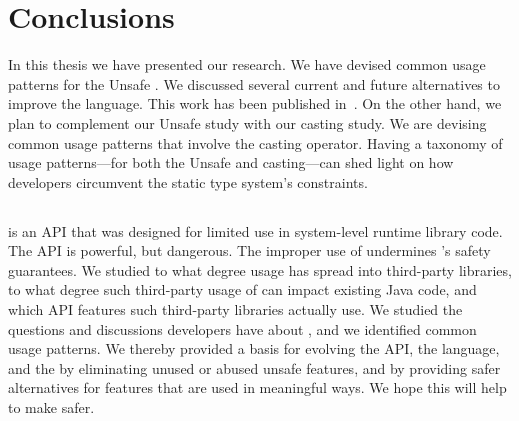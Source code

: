 \chapter{Conclusions}\label{cha:conclusions}

In this thesis we have presented our research.
We have devised common usage patterns for the \java{} Unsafe \api.
We discussed several current and future alternatives to improve the
\java{} language.
This work has been published in~\citep{mastrangeloUseYourOwn2015}.
On the other hand, we plan to complement our Unsafe \api{} study with 
our casting study.
We are devising common usage patterns that involve the casting operator.
Having a taxonomy of usage patterns---for both the Unsafe \api{} and casting---can shed light on how \java{} developers circumvent the static type system's constraints.



\section*{}

\smu{} is an API that was designed for limited use in system-level runtime library code.
The \unsafe{} API is powerful, but dangerous.
The improper use of \unsafe{} undermines \java{}'s safety guarantees.
We studied to what degree \unsafe{} usage has spread into third-party libraries,
to what degree such third-party usage of \unsafe{} can impact existing Java code,
and which \unsafe{} API features such third-party libraries actually use.
We studied the questions and discussions developers have about \unsafe{},
and we identified common usage patterns.
We thereby provided a basis for evolving the \unsafe{} API, the \java{} language, and the \jvm{}
by eliminating unused or abused unsafe features,
and by providing safer alternatives for features that are used in meaningful ways.
We hope this will help to make \unsafe{} safer.


\section*{}

